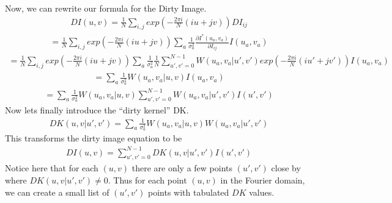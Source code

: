 \documentclass[letterpaper,10pt,english]{jupyterBook}
\begin{document}
\sphinxAtStartPar
Now, we can rewrite our formula for the Dirty Image.
\begin{equation*}
\begin{split}DI(u,v) = \frac{1}{N}\sum_{i,j} exp(-\frac{2\pi i}{N}(iu+jv))DI_{ij}\end{split}
\end{equation*}\begin{equation*}
\begin{split} = \frac{1}{N}\sum_{i,j} exp(-\frac{2\pi i}{N}(iu+jv)) \sum_a \frac{1}{\sigma^2_a}\frac{\partial I^*(u_a,v_a)}{\partial I_{ij}}I(u_a,v_a)\end{split}
\end{equation*}\begin{equation*}
\begin{split} = \frac{1}{N}\sum_{i,j} exp(-\frac{2\pi i}{N}(iu+jv)) \sum_a \frac{1}{\sigma^2_a}\frac{1}{N}\sum^{N-1}_{u',v' = 0} W(u_a,v_a|u',v') exp(-\frac{2\pi i}{N}(iu'+jv'))I(u_a,v_a)\end{split}
\end{equation*}\begin{equation*}
\begin{split} = \sum_a \frac{1}{\sigma^2_a}W(u_a,v_a|u,v)I(u_a,v_a) \end{split}
\end{equation*}\begin{equation*}
\begin{split} = \sum_a \frac{1}{\sigma^2_a}W(u_a,v_a|u,v)\sum^{N-1}_{u',v' = 0} W(u_a,v_a|u',v')I(u',v')\end{split}
\end{equation*}
\sphinxAtStartPar
Now lets finally introduce the “dirty kernel” DK.
\begin{equation*}
\begin{split}DK(u,v|u',v') = \sum_a \frac{1}{\sigma^2_a}W(u_a,v_a|u,v)W(u_a,v_a|u',v')\end{split}
\end{equation*}
\sphinxAtStartPar
This transforms the dirty image equation to be
\begin{equation*}
\begin{split}DI(u,v) = \sum^{N-1}_{u',v' = 0} DK(u,v|u',v') I(u',v')\end{split}
\end{equation*}
\sphinxAtStartPar
Notice here that for each \((u,v)\) there are only a few points \((u',v')\) close by where \(DK(u,v|u',v') \neq 0\). Thus for each point \((u,v)\) in the Fourier domain, we can create a small list of \((u',v')\) points with tabulated \(DK\) values.
\end{document}
